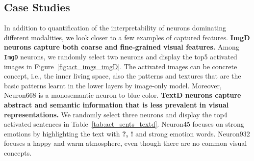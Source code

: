\vspace{-2mm}
\subsection{Case Studies}
\vspace{-2mm}
In addition to quantification of the interpretability of neurons dominating different modalities, we look closer to a few examples of captured features. \textbf{ImgD neurons capture both coarse and fine-grained visual features.} Among \texttt{ImgD} neurons, we randomly select two neurons and display the top5 activated images in Figure~\ref{fig:act_imgs_imgD}. The activated images can be concrete concept, i.e., the inner living space, also the patterns and textures that are the basic patterns learnt in the lower layers by image-only model. Moreover, Neuron668 is a monosemantic neuron to blue color. 
\textbf{TextD neurons capture abstract and semantic information that is less prevalent in visual representations.} We randomly select three neurons and display the top4 activated sentences in Table~\ref{tab:act_sents_textd}. Neuron45 focuses on strong emotions by highlighting the text with \textbf{?, !} and strong emotion words. Neuron932 focuses a happy and warm atmosphere, even though there are no common visual concepts.


